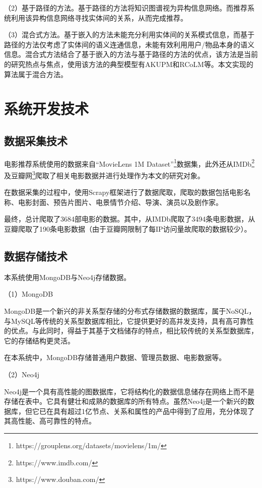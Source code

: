 \documentclass{bjfuthesis}
\begin{document}
（2）基于路径的方法\cite{lin2015modeling, guu2015traversing, toutanova2016compositional}。基于路径的方法将知识图谱视为异构信息网络。而推荐系统利用该异构信息网络寻找实体间的关系，从而完成推荐。

（3）混合式方法。基于嵌入的方法未能充分利用实体间的关系模式信息，而基于路径的方法仅考虑了实体间的语义连通信息，未能有效利用用户/物品本身的语义信息。混合式方法结合了基于嵌入的方法与基于路径的方法的优点，该方法是当前的研究热点与焦点，使用该方法的典型模型有AKUPM\cite{tang2019akupm}和RCoLM\cite{cao2019unifying}等。本文实现的算法属于混合方法。
\section{系统开发技术}
\label{sec:tech-stack}
\subsection{数据采集技术}
电影推荐系统使用的数据来自“MovieLens 1M Dataset”\footnote{https://grouplens.org/datasets/movielens/1m/}数据集，此外还从IMDb\footnote{https://www.imdb.com/}及豆瓣网\footnote{https://www.douban.com/}爬取了相关电影数据并进行处理作为本文的研究对象。

在数据采集的过程中，使用Scrapy框架进行了数据爬取，爬取的数据包括电影名称、电影封面、预告片图片、电景情节介绍、导演、演员以及剧作家。

最终，总计爬取了3684部电影的数据。其中，从IMDb爬取了3494条电影数据，从豆瓣爬取了190条电影数据（由于豆瓣网限制了每IP访问量故爬取的数据较少）。
\subsection{数据存储技术}
本系统使用MongoDB与Neo4j存储数据。

\noindent （1）MongoDB

MongoDB是一个新兴的非关系型存储的分布式存储数据的数据库，属于NoSQL，与MySQL等传统的关系型数据库相比，它提供更好的高并发支持，具有高可靠性的优点。与此同时，得益于其基于文档储存的特点，相比较传统的关系型数据库，它的存储结构更灵活。

在本系统中，MongoDB存储普通用户数据、管理员数据、电影数据等。

\noindent（2）Neo4j

Neo4j是一个具有高性能的图数据库，它将结构化的数据信息储存在网络上而不是存储在表中。它具有健壮和成熟的数据库的所有特点。虽然Neo4j是一个新兴的数据库，但它已在具有超过1亿节点、关系和属性的产品中得到了应用，充分体现了其高性能、高可靠性的特点。
\end{document}
